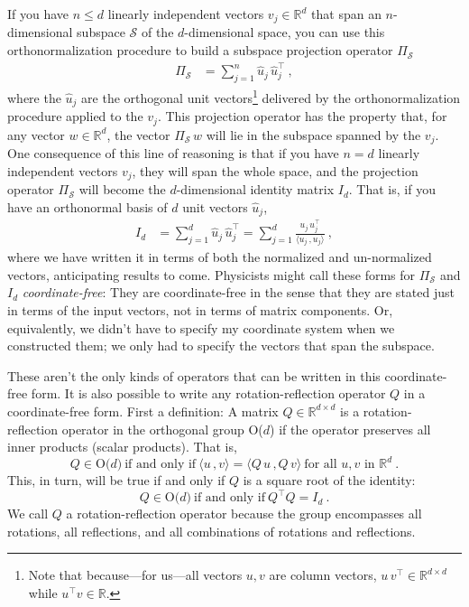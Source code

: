 \documentclass{article}
\newcommand{\inner}[2]{\langle{#1}\,,{#2}\rangle}
\begin{document}
If you have $n\leq d$ linearly independent vectors $v_j\in\mathbb{R}^d$ that span an $n$-dimensional subspace $\mathscr{S}$ of the $d$-dimensional space, you can use this orthonormalization procedure to build a subspace projection operator $\Pi_\mathscr{S}$
\begin{align}\label{eq:oproj}
    \Pi_\mathscr{S} &= \sum_{j=1}^n \hat{u}_j\,\hat{u}_j^\top ~,
\end{align}
where the $\hat{u}_j$ are the orthogonal unit vectors\footnote{Note that because---for us---all vectors $u,v$ are column vectors, $u\,v^\top\in\mathbb{R}^{d\times d}$ while $u^\top v\in\mathbb{R}$.} delivered by the orthonormalization procedure applied to the $v_j$.
This projection operator has the property that, for any vector $w\in\mathbb{R}^d$, the vector $\Pi_\mathscr{S}\,w$ will lie in the subspace spanned by the $v_j$.
One consequence of this line of reasoning is that if you have $n=d$ linearly independent vectors $v_j$, they will span the whole space, and the projection operator $\Pi_\mathscr{S}$ will become the $d$-dimensional identity matrix $I_d$.
That is, if you have an orthonormal basis of $d$ unit vectors $\hat{u}_j$,
\begin{align}\label{eq:oI}
    I_d &= \sum_{j=1}^d \hat{u}_j\,\hat{u}_j^\top = \sum_{j=1}^d \frac{u_j\,u_j^\top}{\inner{u_j}{u_j}} ~,
\end{align}
where we have written it in terms of both the normalized and un-normalized vectors, anticipating results to come.
Physicists might call these forms for $\Pi_\mathscr{S}$ and $I_d$ \emph{coordinate-free}:
They are coordinate-free in the sense that they are stated just in terms of the input vectors, not in terms of matrix components.
Or, equivalently, we didn't have to specify my coordinate system when we constructed them; we only had to specify the vectors that span the subspace.

These aren't the only kinds of operators that can be written in this coordinate-free form.
It is also possible to write any rotation-reflection operator $Q$ in a coordinate-free form.
First a definition: A matrix $Q\in\mathbb{R}^{d\times d}$ is a rotation-reflection operator in the orthogonal group O($d$) if the operator preserves all inner products (scalar products).
That is,
\begin{equation}
    Q \in \mbox{O($d$)} ~ \mbox{if and only if} ~ \inner{u}{v}=\inner{Q\,u}{Q\,v} ~ \mbox{for all $u,v$ in $\mathbb{R}^d$} ~ .\label{eq:orth1}
\end{equation}
This, in turn, will be true if and only if $Q$ is a square root of the identity:
\begin{equation}
    Q \in \mbox{O($d$)} ~ \mbox{if and only if} ~ Q^\top Q=I_d ~ .\label{eq:orth2}
\end{equation}
We call $Q$ a rotation-reflection operator because the group encompasses all rotations, all reflections, and all combinations of rotations and reflections.
\end{document}

